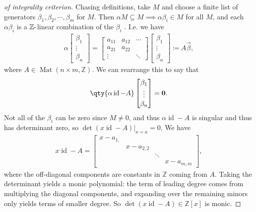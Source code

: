 \begin{proof}[of integrality criterion]

Chasing definitions, take \(M\) and choose a finite list of generators
\(\beta_1, \beta_2, \cdots, \beta_m\) for \(M\). Then
\(\alpha M \subseteq M \implies \alpha \beta_i \in M\) for all \(M\),
and each \(\alpha \beta_i\) is a \({\mathbb{Z}}{\hbox{-}}\)linear
combination of the \(\beta_i\) . I.e. we have
\begin{align*}
\alpha 
\begin{bmatrix}
\beta_1 
\\
\vdots  
\\
\beta_n  
\end{bmatrix}
= 
\begin{bmatrix}
a_{11} & a_{12} & \cdots
\\
a_{21} &  a_{22} & 
\\
 \vdots &  &\ddots  
\end{bmatrix}
\begin{bmatrix}
\beta_1 
\\
\vdots  
\\
\beta_n  
\end{bmatrix}
\coloneqq A \vec{\beta}
,\end{align*}
where \(A \in \operatorname{Mat}(n\times m, {\mathbb{Z}})\). We can
rearrange this to say that
\begin{align*}
\qty{ \alpha \operatorname{id}- A} 
\begin{bmatrix}
\beta_1 
\\
\vdots  
\\
\beta_n  
\end{bmatrix}
=
\mathbf{0}
.\end{align*}
Not all of the \(\beta_i\) can be zero since \(M\neq 0\), and thus
\(\alpha \operatorname{id}- A\) is singular and thus has determinant
zero, so \(\det(x \operatorname{id}- A)\Big|_{x=a} = 0\). We have
\begin{align*}
x\operatorname{id}- A = 
\begin{bmatrix}
x - a_{1,} &  & &
\\
&  x - a_{2, 2} & & 
\\
&  & \ddots &
\\
& &  & x - a_{m, m}
\end{bmatrix}
,\end{align*}
where the off-diagonal components are constants in \({\mathbb{Z}}\)
coming from \(A\). Taking the determinant yields a monic polynomial: the
term of leading degree comes from multiplying the diagonal components,
and expanding over the remaining minors only yields terms of smaller
degree. So \(\det (x\operatorname{id}- A) \in {\mathbb{Z}}[x]\) is
monic.

\end{proof}


